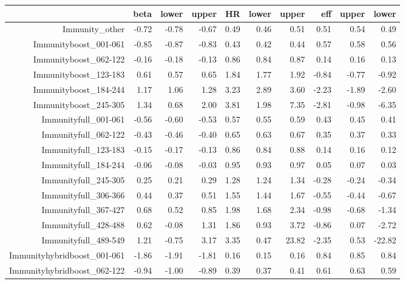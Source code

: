 \begin{table}[ht]
\centering
\begin{tabular}{rrrrrrrrrr}
  \hline
 & beta & lower & upper & HR & lower & upper & eff & upper & lower \\ 
  \hline
Immunity\_other & -0.72 & -0.78 & -0.67 & 0.49 & 0.46 & 0.51 & 0.51 & 0.54 & 0.49 \\ 
  Immunityboost\_001-061 & -0.85 & -0.87 & -0.83 & 0.43 & 0.42 & 0.44 & 0.57 & 0.58 & 0.56 \\ 
  Immunityboost\_062-122 & -0.16 & -0.18 & -0.13 & 0.86 & 0.84 & 0.87 & 0.14 & 0.16 & 0.13 \\ 
  Immunityboost\_123-183 & 0.61 & 0.57 & 0.65 & 1.84 & 1.77 & 1.92 & -0.84 & -0.77 & -0.92 \\ 
  Immunityboost\_184-244 & 1.17 & 1.06 & 1.28 & 3.23 & 2.89 & 3.60 & -2.23 & -1.89 & -2.60 \\ 
  Immunityboost\_245-305 & 1.34 & 0.68 & 2.00 & 3.81 & 1.98 & 7.35 & -2.81 & -0.98 & -6.35 \\ 
  Immunityfull\_001-061 & -0.56 & -0.60 & -0.53 & 0.57 & 0.55 & 0.59 & 0.43 & 0.45 & 0.41 \\ 
  Immunityfull\_062-122 & -0.43 & -0.46 & -0.40 & 0.65 & 0.63 & 0.67 & 0.35 & 0.37 & 0.33 \\ 
  Immunityfull\_123-183 & -0.15 & -0.17 & -0.13 & 0.86 & 0.84 & 0.88 & 0.14 & 0.16 & 0.12 \\ 
  Immunityfull\_184-244 & -0.06 & -0.08 & -0.03 & 0.95 & 0.93 & 0.97 & 0.05 & 0.07 & 0.03 \\ 
  Immunityfull\_245-305 & 0.25 & 0.21 & 0.29 & 1.28 & 1.24 & 1.34 & -0.28 & -0.24 & -0.34 \\ 
  Immunityfull\_306-366 & 0.44 & 0.37 & 0.51 & 1.55 & 1.44 & 1.67 & -0.55 & -0.44 & -0.67 \\ 
  Immunityfull\_367-427 & 0.68 & 0.52 & 0.85 & 1.98 & 1.68 & 2.34 & -0.98 & -0.68 & -1.34 \\ 
  Immunityfull\_428-488 & 0.62 & -0.08 & 1.31 & 1.86 & 0.93 & 3.72 & -0.86 & 0.07 & -2.72 \\ 
  Immunityfull\_489-549 & 1.21 & -0.75 & 3.17 & 3.35 & 0.47 & 23.82 & -2.35 & 0.53 & -22.82 \\ 
  Immunityhybridboost\_001-061 & -1.86 & -1.91 & -1.81 & 0.16 & 0.15 & 0.16 & 0.84 & 0.85 & 0.84 \\ 
  Immunityhybridboost\_062-122 & -0.94 & -1.00 & -0.89 & 0.39 & 0.37 & 0.41 & 0.61 & 0.63 & 0.59 \\ 

\end{tabular}
\end{table}

